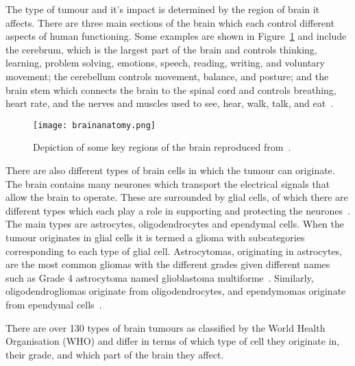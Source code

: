 The type of tumour and it's impact is determined by the region of brain it affects. There are three main sections of the brain which each control different aspects of human functioning. Some examples are shown in Figure~\ref{fig:anatomybrain} and include the cerebrum, which is the largest part of the brain and controls thinking, learning, problem solving, emotions, speech, reading, writing, and voluntary movement; the cerebellum controls movement, balance, and posture; and the brain stem which connects the brain to the spinal cord and controls breathing, heart rate, and the nerves and muscles used to see, hear, walk, talk, and eat~\citep{Institute2023}.
\begin{figure}[ht]
    \centering
    \texttt{[image: brainanatomy.png]}
    \caption{Depiction of some key regions of the brain reproduced from~\citep{NursingHero2024}.}
    \label{fig:anatomybrain}
\end{figure}
There are also different types of brain cells in which the tumour can originate. The brain contains many neurones which transport the electrical signals that allow the brain to operate. These are surrounded by glial cells, of which there are different types which each play a role in supporting and protecting the neurones~\citep{TheBrainTumourCharity2023}. The main types are astrocytes, oligodendrocytes and ependymal cells. When the tumour originates in glial cells it is termed a glioma with subcategories corresponding to each type of glial cell. Astrocytomas, originating in astrocytes, are the most common gliomas with the different grades given different names such as Grade 4 astrocytoma named glioblastoma multiforme~\citep{BrainTumourResearch2023}. Similarly, oligodendrogliomas originate from oligodendrocytes, and ependymomas originate from ependymal cells~\citep{TheBrainTumourCharity2023}. %

There are over 130 types of brain tumours as classified by the World Health Organisation (WHO) and differ in terms of which type of cell they originate in, their grade, and which part of the brain they affect.

